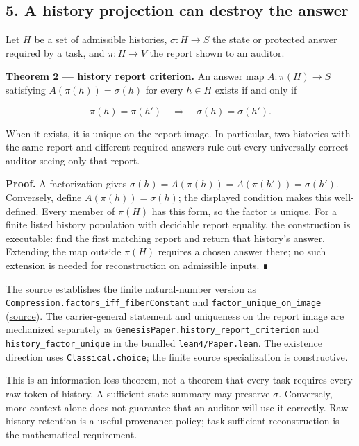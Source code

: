 \documentclass[
  11pt,
]{article}
\begin{document}
\subsection{5. A history projection can destroy the
answer}\label{a-history-projection-can-destroy-the-answer}

Let \(H\) be a set of admissible histories, \(\sigma:H\to S\) the state
or protected answer required by a task, and \(\pi:H\to V\) the report
shown to an auditor.

\textbf{Theorem 2 --- history report criterion.} An answer map
\(A:\pi(H)\to S\) satisfying \(A(\pi(h))=\sigma(h)\) for every
\(h\in H\) exists if and only if

\[
\pi(h)=\pi(h')\quad\Longrightarrow\quad\sigma(h)=\sigma(h').
\]

When it exists, it is unique on the report image. In particular, two
histories with the same report and different required answers rule out
every universally correct auditor seeing only that report.

\textbf{Proof.} A factorization gives
\(\sigma(h)=A(\pi(h))=A(\pi(h'))=\sigma(h')\). Conversely, define
\(A(\pi(h))=\sigma(h)\); the displayed condition makes this
well-defined. Every member of \(\pi(H)\) has this form, so the factor is
unique. For a finite listed history population with decidable report
equality, the construction is executable: find the first matching report
and return that history's answer. Extending the map outside \(\pi(H)\)
requires a chosen answer there; no such extension is needed for
reconstruction on admissible inputs. ∎

The source establishes the finite natural-number version as
\nolinkurl{Compression.factors_iff_fiberConstant} and
\nolinkurl{factor_unique_on_image}
(\href{lean4/Derivation/Compression.lean\#L167}{source}). The
carrier-general statement and uniqueness on the report image are
mechanized separately as
\nolinkurl{GenesisPaper.history_report_criterion} and
\nolinkurl{history_factor_unique} in the bundled
\nolinkurl{lean4/Paper.lean}. The existence direction uses
\nolinkurl{Classical.choice}; the finite source specialization is
constructive.

This is an information-loss theorem, not a theorem that every task
requires every raw token of history. A sufficient state summary may
preserve \(\sigma\). Conversely, more context alone does not guarantee
that an auditor will use it correctly. Raw history retention is a useful
provenance policy; task-sufficient reconstruction is the mathematical
requirement.
\end{document}
